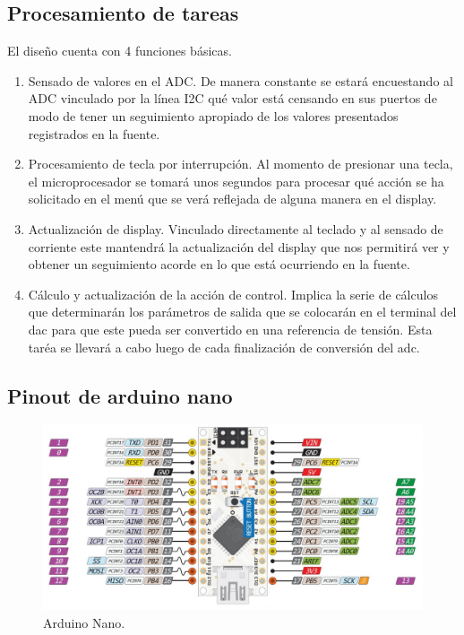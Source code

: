 \subsection{Procesamiento de tareas}
El diseño cuenta con 4 funciones básicas.
\begin{enumerate}
    \item Sensado de valores en el ADC.
    De manera constante se estará encuestando al ADC vinculado por la línea I2C qué valor está censando en sus puertos de modo de tener un seguimiento apropiado de los valores presentados registrados en la fuente.    
    \item Procesamiento de tecla por interrupción.
    Al momento de presionar una tecla, el microprocesador se tomará unos segundos para procesar qué acción se ha solicitado en el menú que se verá reflejada de alguna manera en el display.
    \item Actualización de display.
    Vinculado directamente al teclado y al sensado de corriente este mantendrá la actualización del display que nos permitirá ver y obtener un seguimiento acorde en lo que está ocurriendo en la fuente.
    \item Cálculo y actualización de la acción de control.
    Implica la serie de cálculos que determinarán los parámetros de salida que se colocarán en el terminal del dac para que este pueda ser convertido en una referencia de tensión. Esta taréa se llevará a cabo luego de cada finalización de conversión del adc.
\end{enumerate}

\subsection{Pinout de arduino nano}

\begin{figure}[H]
    \centering
    \includegraphics[scale=0.3]{./imagenes/arduino_nano.jpg}
    \caption{Arduino Nano.}
    \label{F:arduino_nano}
\end{figure}

